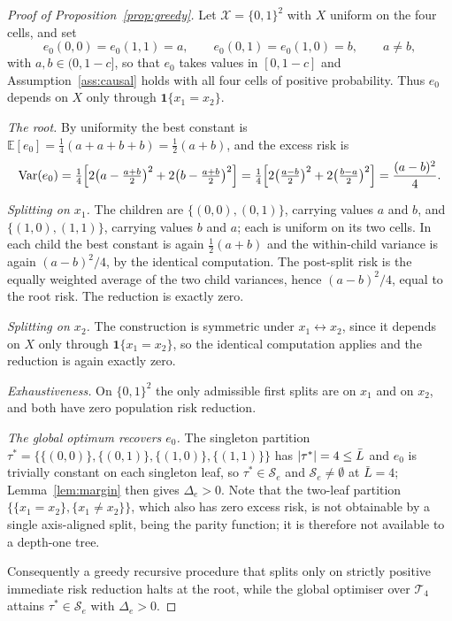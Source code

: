 \documentclass[11pt]{article}
\theoremstyle{plain}
\theoremstyle{definition}
\theoremstyle{remark}
\newcommand{\E}{\mathbb{E}}
\newcommand{\cX}{\mathcal{X}}
\newcommand{\cT}{\mathcal{T}}
\newcommand{\cS}{\mathcal{S}}
\newcommand{\ez}{e_0}
\DeclareMathOperator{\Var}{Var}
\DeclarePairedDelimiter{\card}{\lvert}{\rvert}
\begin{document}
\begin{proof}[Proof of Proposition~\ref{prop:greedy}]
Let $\cX=\{0,1\}^2$ with $X$ uniform on the four cells, and set
\[
  \ez(0,0)=\ez(1,1)=a,\qquad \ez(0,1)=\ez(1,0)=b,\qquad a\ne b,
\]
with $a,b\in(0,1-c]$, so that $\ez$ takes values in $[0,1-c]$ and
Assumption~\ref{ass:causal} holds with all four cells of positive probability.
Thus $\ez$ depends on $X$ only through $\mathbf1\{x_1=x_2\}$.

\emph{The root.} By uniformity the best constant is
$\E[\ez]=\tfrac14(a+a+b+b)=\tfrac12(a+b)$, and the excess risk is
\[
  \Var(\ez)=\tfrac14\Bigl[2\bigl(a-\tfrac{a+b}2\bigr)^2
   +2\bigl(b-\tfrac{a+b}2\bigr)^2\Bigr]
  =\tfrac14\Bigl[2\bigl(\tfrac{a-b}2\bigr)^2+2\bigl(\tfrac{b-a}2\bigr)^2\Bigr]
  =\frac{(a-b)^2}4 .
\]

\emph{Splitting on $x_1$.} The children are $\{(0,0),(0,1)\}$, carrying values
$a$ and $b$, and $\{(1,0),(1,1)\}$, carrying values $b$ and $a$; each is uniform
on its two cells. In each child the best constant is again $\tfrac12(a+b)$ and
the within-child variance is again $(a-b)^2/4$, by the identical computation. The
post-split risk is the equally weighted average of the two child variances, hence
$(a-b)^2/4$, equal to the root risk. The reduction is exactly zero.

\emph{Splitting on $x_2$.} The construction is symmetric under
$x_1\leftrightarrow x_2$, since it depends on $X$ only through
$\mathbf1\{x_1=x_2\}$, so the identical computation applies and the reduction is
again exactly zero.

\emph{Exhaustiveness.} On $\{0,1\}^2$ the only admissible first splits are on
$x_1$ and on $x_2$, and both have zero population risk reduction.

\emph{The global optimum recovers $\ez$.} The singleton partition
$\tau^*=\{\{(0,0)\},\{(0,1)\},\{(1,0)\},\{(1,1)\}\}$ has $\card{\tau^*}=4\le\bar L$
and $\ez$ is trivially constant on each singleton leaf, so $\tau^*\in\cS_e$ and
$\cS_e\ne\emptyset$ at $\bar L=4$; Lemma~\ref{lem:margin} then gives
$\Delta_e>0$. Note that the two-leaf partition
$\{\{x_1=x_2\},\{x_1\ne x_2\}\}$, which also has zero excess risk, is not
obtainable by a single axis-aligned split, being the parity function; it is
therefore not available to a depth-one tree.

Consequently a greedy recursive procedure that splits only on strictly positive
immediate risk reduction halts at the root, while the global optimiser over
$\cT_4$ attains $\tau^*\in\cS_e$ with $\Delta_e>0$.
\end{proof}
\end{document}
